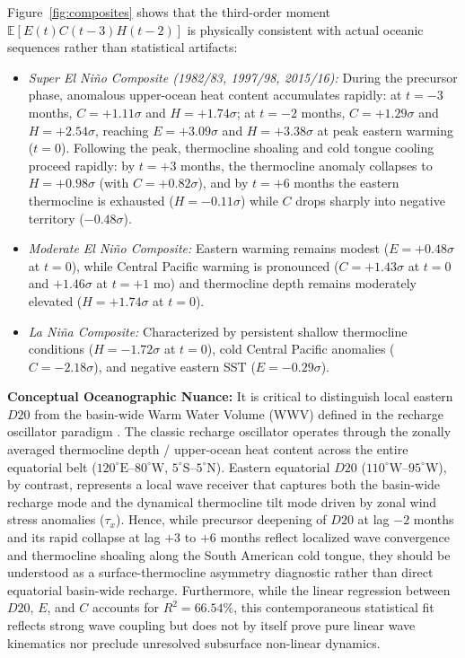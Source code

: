 \documentclass[11pt,a4paper]{article}
\begin{document}
Figure~\ref{fig:composites} shows that the third-order moment $\mathbb{E}[E(t) C(t-3) H(t-2)]$ is physically consistent with actual oceanic sequences rather than statistical artifacts:
\begin{itemize}
    \item \textit{Super El Ni\~no Composite (1982/83, 1997/98, 2015/16):} During the precursor phase, anomalous upper-ocean heat content accumulates rapidly: at $t = -3$ months, $C = +1.11\sigma$ and $H = +1.74\sigma$; at $t = -2$ months, $C = +1.29\sigma$ and $H = +2.54\sigma$, reaching $E = +3.09\sigma$ and $H = +3.38\sigma$ at peak eastern warming ($t = 0$). Following the peak, thermocline shoaling and cold tongue cooling proceed rapidly: by $t = +3$ months, the thermocline anomaly collapses to $H = +0.98\sigma$ (with $C = +0.82\sigma$), and by $t = +6$ months the eastern thermocline is exhausted ($H = -0.11\sigma$) while $C$ drops sharply into negative territory ($-0.48\sigma$).
    \item \textit{Moderate El Ni\~no Composite:} Eastern warming remains modest ($E = +0.48\sigma$ at $t = 0$), while Central Pacific warming is pronounced ($C = +1.43\sigma$ at $t = 0$ and $+1.46\sigma$ at $t = +1$ mo) and thermocline depth remains moderately elevated ($H = +1.74\sigma$ at $t=0$).
    \item \textit{La Ni\~na Composite:} Characterized by persistent shallow thermocline conditions ($H = -1.72\sigma$ at $t = 0$), cold Central Pacific anomalies ($C = -2.18\sigma$), and negative eastern SST ($E = -0.29\sigma$).
\end{itemize}

\textbf{Conceptual Oceanographic Nuance:} It is critical to distinguish local eastern $D20$ from the basin-wide Warm Water Volume (WWV) defined in the recharge oscillator paradigm \citep{jin1997paradigm, meinen2000observations, vialard2025recharge}. The classic recharge oscillator operates through the zonally averaged thermocline depth / upper-ocean heat content across the entire equatorial belt ($120^\circ\text{E}$--$80^\circ\text{W}$, $5^\circ\text{S}$--$5^\circ\text{N}$). Eastern equatorial $D20$ ($110^\circ\text{W}$--$95^\circ\text{W}$), by contrast, represents a local wave receiver that captures both the basin-wide recharge mode and the dynamical thermocline tilt mode driven by zonal wind stress anomalies ($\tau_x$). Hence, while precursor deepening of $D20$ at lag $-2$ months and its rapid collapse at lag $+3$ to $+6$ months reflect localized wave convergence and thermocline shoaling along the South American cold tongue, they should be understood as a surface-thermocline asymmetry diagnostic rather than direct equatorial basin-wide recharge. Furthermore, while the linear regression between $D20$, $E$, and $C$ accounts for $R^2 = 66.54\%$, this contemporaneous statistical fit reflects strong wave coupling but does not by itself prove pure linear wave kinematics nor preclude unresolved subsurface non-linear dynamics.
\end{document}
